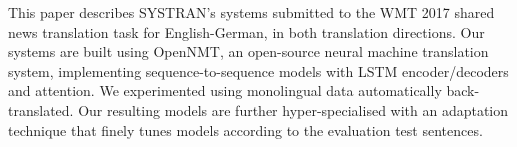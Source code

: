 This paper describes SYSTRAN's systems submitted to the WMT 2017 shared news translation task for English-German, in both translation directions. Our systems are built using OpenNMT, an open-source neural machine translation system, implementing sequence-to-sequence models with LSTM encoder/decoders and attention. We experimented using monolingual data automatically back-translated. Our resulting models are further hyper-specialised with an adaptation technique that finely tunes models according to the evaluation test sentences.
